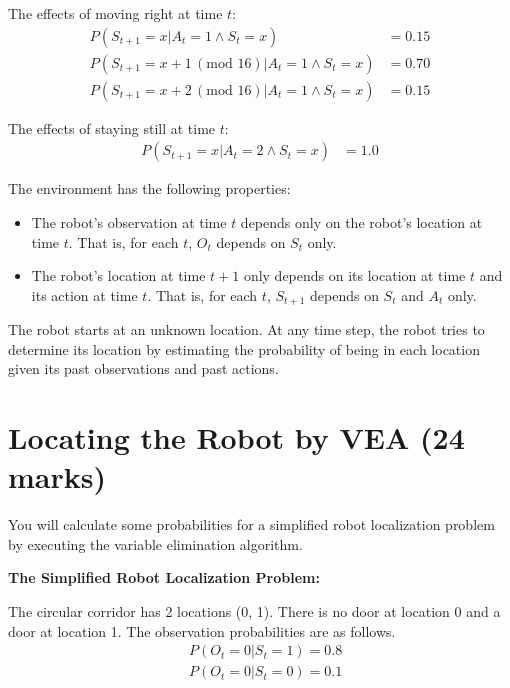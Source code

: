\documentclass[12pt]{article}
\begin{document}
The effects of moving right at time $t$:
\begin{align}
P(S_{t+1} = x | A_t = 1\land S_t = x) & = 0.15\\    
P(S_{t+1} = x + 1 \,(\text{mod } 16) | A_t = 1 \land S_t = x) & = 0.70\\    
P(S_{t+1} = x + 2 \,(\text{mod } 16)| A_t = 1 \land S_t = x) & = 0.15  
\end{align}

The effects of staying still at time $t$:
\begin{align}
P(S_{t+1} = x | A_t = 2\land S_t = x) & = 1.0
\end{align}

The environment has the following properties:
\begin{itemize}

\item The robot's observation at time $t$ depends only on the robot's location at time $t$. That is, for each $t$, $O_t$ depends on $S_t$ only.

\item The robot's location at time $t + 1$ only depends on its location at time $t$ and its action at time $t$. That is, for each $t$, $S_{t+1}$ depends on $S_t$ and $A_t$ only. 
\end{itemize}

The robot starts at an unknown location. At any time step, the robot tries to determine its location by estimating the probability of being in each location given its past observations and past actions. 





\newpage
\section{Locating the Robot by VEA (24 marks)}

You will calculate some probabilities for a simplified robot localization problem by executing the variable elimination algorithm.

{\bf The Simplified Robot Localization Problem: }

The circular corridor has 2 locations (0, 1). There is no door at location 0 and a door at location 1. The observation probabilities are as follows.
\begin{align}
& P(O_t = 0 | S_t = 1) = 0.8 \\
& P(O_t = 0 | S_t = 0) = 0.1 
\end{align}
\end{document}
